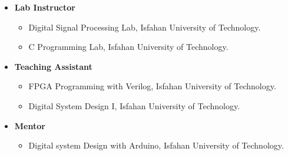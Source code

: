 

\begin{cventries}




\begin{itemize}



\item[] \textbf{Lab Instructor}
 \begin{itemize}
    \item Digital Signal Processing Lab, Isfahan University of Technology.
    \item C Programming Lab, Isfahan University of Technology.
 \end{itemize}

\item[] \textbf{Teaching Assistant}
 \begin{itemize}
    \item FPGA Programming with Verilog, Isfahan University of Technology.
    \item Digital System Design I, Isfahan University of Technology.
 \end{itemize}


\item[] \textbf{Mentor}
 \begin{itemize}
    \item Digital system Design with Arduino, Isfahan University of Technology.
 \end{itemize}
 

\end{itemize}
\end{cventries}
